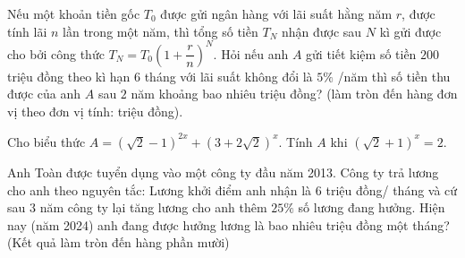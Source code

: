 \begin{ex}%
	Nếu một khoản tiền gốc $T_0$ được gửi ngân hàng với lãi suất hằng năm $r$, được tính lãi $n$ lần trong một năm, thì tổng số tiền $T_N$ nhận được sau $N$ kì gửi được cho bởi công thức $T_N=T_0\left(1+\dfrac{r}{n}\right)^N$. Hỏi  nếu anh $A$ gửi tiết kiệm số tiền $200$ triệu đồng theo kì hạn $6$ tháng với lãi suất không đổi là $5\%$ /năm thì số tiền thu được của anh $A$ sau $2$ năm khoảng bao nhiêu triệu đồng? (làm tròn đến hàng đơn vị theo đơn vị tính: triệu đồng).
\end{ex}

\begin{ex}%
	Cho  biểu thức $A=(\sqrt{2}-1)^{2 x}+(3+2 \sqrt{2})^x$. Tính $A$ khi $(\sqrt{2}+1)^x=2$.
\end{ex}

\begin{ex}%
	Anh Toàn được tuyển dụng vào một công ty  đầu năm 2013. Công ty trả lương cho anh theo nguyên tắc: Lương khởi điểm anh nhận là $6$ triệu đồng/ tháng và cứ sau $3$ năm công ty lại tăng lương cho anh thêm $25\%$ số lương đang hưởng. Hiện nay (năm 2024) anh đang được hưởng lương là bao nhiêu triệu đồng một tháng? (Kết quả làm tròn đến hàng phần mười)
\end{ex}

